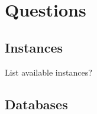 
\newpage
\section{Questions}

\subsection{Instances}
\begin{itemize*}
     \item{} List available instances?
\end{itemize*}

\subsection{Databases}


